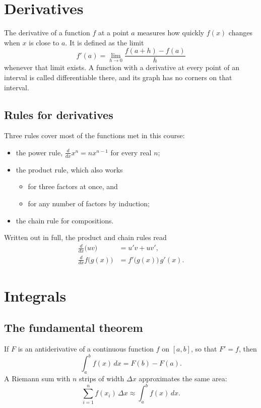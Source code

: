 \documentclass[11pt]{article}
\begin{document}
\section{Derivatives}

The derivative of a function $f$ at a point $a$ measures how quickly $f(x)$ changes
when $x$ is close to $a$. It is defined as the limit
\begin{equation}
  f'(a) = \lim_{h \to 0} \frac{f(a+h) - f(a)}{h}
  \label{eq:definition}
\end{equation}
whenever that limit exists. A function with a derivative at every point of an interval
is called differentiable there, and its graph has no corners on that interval.

\subsection{Rules for derivatives}

Three rules cover most of the functions met in this course:
\begin{itemize}
  \item the power rule, $\frac{d}{dx} x^n = n x^{n-1}$ for every real $n$;
  \item the product rule, which also works
  \begin{itemize}
    \item for three factors at once, and
    \item for any number of factors by induction;
  \end{itemize}
  \item the chain rule for compositions.
\end{itemize}
Written out in full, the product and chain rules read
\begin{align}
  \frac{d}{dx}\bigl(u v\bigr) &= u' v + u v', \label{eq:product}\\
  \frac{d}{dx} f\bigl(g(x)\bigr) &= f'\bigl(g(x)\bigr)\, g'(x). \label{eq:chain}
\end{align}

\section{Integrals}

\subsection{The fundamental theorem}

If $F$ is an antiderivative of a continuous function $f$ on $[a, b]$, so that
$F' = f$, then
\[
  \int_a^b f(x)\,dx = F(b) - F(a).
\]
A Riemann sum with $n$ strips of width $\Delta x$ approximates the same area:
\begin{equation}
  \sum_{i=1}^{n} f(x_i)\,\Delta x \approx \int_a^b f(x)\,dx .
  \label{eq:riemann}
\end{equation}
\end{document}
